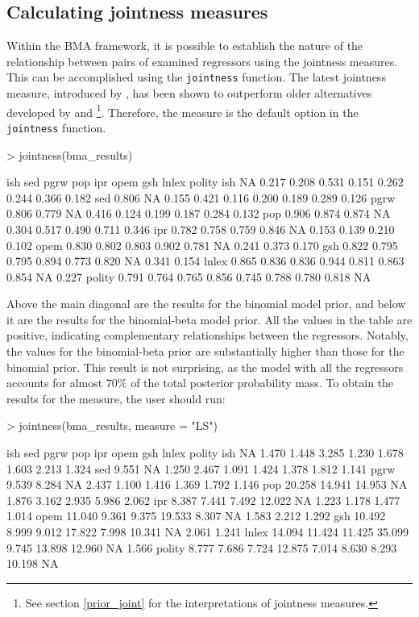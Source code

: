 \documentclass[a4paper]{article}
\begin{document}
\subsection{Calculating jointness measures}
Within the BMA framework, it is possible to establish the nature of the relationship between pairs of examined regressors using the jointness measures.
This can be accomplished using the \verb+jointness+ function.
The latest jointness measure, introduced by \citet{Hofmarcher+2018}, has been shown to outperform older alternatives developed by \citet{Ley+2007} and \citet{Doppelhofer+2009}\footnote{See section \ref{prior_joint} for the interpretations of jointness measures.}.
Therefore, the \citet{Hofmarcher+2018} measure is the default option in the \verb+jointness+ function.
\begin{Schunk}
\begin{Sinput}
> jointness(bma_results)
\end{Sinput}
\begin{Soutput}
         ish   sed  pgrw   pop   ipr  opem   gsh lnlex polity
ish       NA 0.217 0.208 0.531 0.151 0.262 0.244 0.366  0.182
sed    0.806    NA 0.155 0.421 0.116 0.200 0.189 0.289  0.126
pgrw   0.806 0.779    NA 0.416 0.124 0.199 0.187 0.284  0.132
pop    0.906 0.874 0.874    NA 0.304 0.517 0.490 0.711  0.346
ipr    0.782 0.758 0.759 0.846    NA 0.153 0.139 0.210  0.102
opem   0.830 0.802 0.803 0.902 0.781    NA 0.241 0.373  0.170
gsh    0.822 0.795 0.795 0.894 0.773 0.820    NA 0.341  0.154
lnlex  0.865 0.836 0.836 0.944 0.811 0.863 0.854    NA  0.227
polity 0.791 0.764 0.765 0.856 0.745 0.788 0.780 0.818     NA
\end{Soutput}
\end{Schunk}
Above the main diagonal are the results for the binomial model prior, and below it are the results for the binomial-beta model prior.
All the values in the table are positive, indicating complementary relationships between the regressors.
Notably, the values for the binomial-beta prior are substantially higher than those for the binomial prior.
This result is not surprising, as the model with all the regressors accounts for almost $70\%$ of the total posterior probability mass.
To obtain the results for the \citet{Ley+2007} measure, the user should run:
\begin{Schunk}
\begin{Sinput}
> jointness(bma_results, measure = "LS")
\end{Sinput}
\begin{Soutput}
          ish    sed   pgrw    pop   ipr   opem    gsh  lnlex polity
ish        NA  1.470  1.448  3.285 1.230  1.678  1.603  2.213  1.324
sed     9.551     NA  1.250  2.467 1.091  1.424  1.378  1.812  1.141
pgrw    9.539  8.284     NA  2.437 1.100  1.416  1.369  1.792  1.146
pop    20.258 14.941 14.953     NA 1.876  3.162  2.935  5.986  2.062
ipr     8.387  7.441  7.492 12.022    NA  1.223  1.178  1.477  1.014
opem   11.040  9.361  9.375 19.533 8.307     NA  1.583  2.212  1.292
gsh    10.492  8.999  9.012 17.822 7.998 10.341     NA  2.061  1.241
lnlex  14.094 11.424 11.425 35.099 9.745 13.898 12.960     NA  1.566
polity  8.777  7.686  7.724 12.875 7.014  8.630  8.293 10.198     NA
\end{Soutput}
\end{Schunk}
\end{document}
